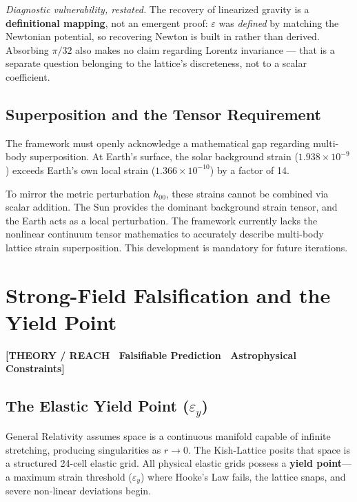 \documentclass[11pt, letterpaper, openany]{book}
\begin{document}
\textit{Diagnostic vulnerability, restated.} The recovery of linearized gravity is a
\textbf{definitional mapping}, not an emergent proof: $\varepsilon$ was \emph{defined} by matching
the Newtonian potential, so recovering Newton is built in rather than derived. Absorbing $\pi/32$
also makes no claim regarding Lorentz invariance --- that is a separate question belonging to the
lattice's discreteness, not to a scalar coefficient.

\section{Superposition and the Tensor Requirement}

The framework must openly acknowledge a mathematical gap regarding multi-body superposition. At Earth's surface, the solar background strain ($1.938 \times 10^{-9}$) exceeds Earth's own local strain ($1.366 \times 10^{-10}$) by a factor of 14. 

To mirror the metric perturbation $h_{00}$, these strains cannot be combined via scalar addition. The Sun provides the dominant background strain tensor, and the Earth acts as a local perturbation. The framework currently lacks the nonlinear continuum tensor mathematics to accurately describe multi-body lattice strain superposition. This development is mandatory for future iterations.

\chapter{Strong-Field Falsification and the Yield Point}

\begin{center}
{\color{theorytag}\textbf{[THEORY / REACH \textbullet\ Falsifiable Prediction \textbullet\ Astrophysical Constraints]}}
\end{center}

\section{The Elastic Yield Point ($\varepsilon_y$)}
\label{sec:yield}

General Relativity assumes space is a continuous manifold capable of infinite stretching, producing singularities as $r \to 0$. The Kish-Lattice posits that space is a structured 24-cell elastic grid. All physical elastic grids possess a \textbf{yield point}—a maximum strain threshold ($\varepsilon_y$) where Hooke's Law fails, the lattice snaps, and severe non-linear deviations begin.
\end{document}
